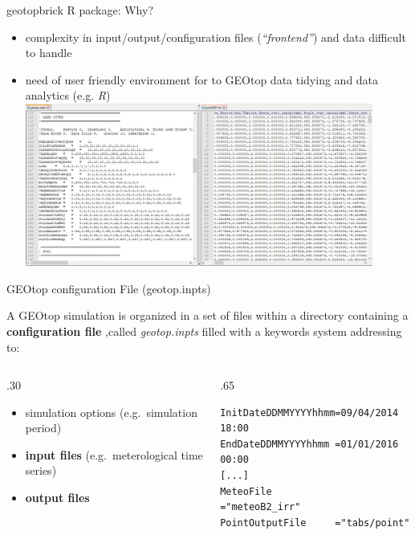 \documentclass[ignorenonframetext,]{beamer}
\providecommand{\tightlist}{%
  \setlength{\itemsep}{0pt}\setlength{\parskip}{0pt}}
\def\begincols{\begin{columns}}
\def\begincol{\begin{column}}
\def\endcol{\end{column}}
\def\endcols{\end{columns}}
\begin{document}
\begin{frame}{geotopbrick R package: Why?}

\begin{itemize}
\tightlist
\item
  complexity in input/output/configuration files (\emph{``frontend''})
  and data difficult to handle
\item
  need of user friendly environment for to GEOtop data tidying and data
  analytics (e.g. \emph{R})
  \includegraphics[width=0.90000\textwidth]{resources/images/Capture_IO_GEOtopJPG.JPG}\\
\end{itemize}

\end{frame}

\begin{frame}[fragile]{GEOtop configuration File (geotop.inpts)}

A GEOtop simulation is organized in a set of files within a directory
containing a \textbf{configuration file} ,called \emph{geotop.inpts}
filled with a keywords system addressing to:

\begincols
 \begincol{.30\textwidth}

\begin{itemize}
\tightlist
\item
  simulation options (e.g.~simulation period)
\item
  \textbf{input files} (e.g.~meterological time series)
\item
  \textbf{output files}
\end{itemize}

\endcol
 \begincol{.65\textwidth}

\begin{verbatim}
InitDateDDMMYYYYhhmm=09/04/2014 18:00  
EndDateDDMMYYYYhhmm =01/01/2016 00:00 
[...] 
MeteoFile           ="meteoB2_irr" 
PointOutputFile     ="tabs/point" 
\end{verbatim}

\endcol
\endcols

\end{frame}
\end{document}
